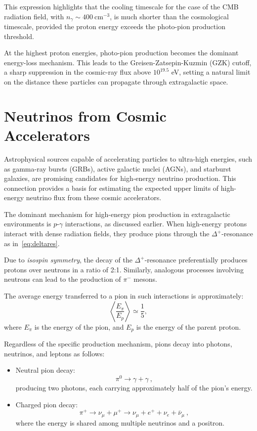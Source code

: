 This expression highlights that the cooling timescale for the case of the CMB radiation field, with \( n_\gamma \sim 400~\text{cm}^{-3} \), is much shorter than the cosmological timescale, provided the proton energy exceeds the photo-pion production threshold.

At the highest proton energies, photo-pion production becomes the dominant energy-loss mechanism. This leads to the Greisen-Zatsepin-Kuzmin (GZK) cutoff, a sharp suppression in the cosmic-ray flux above \( 10^{19.5} \) eV, setting a natural limit on the distance these particles can propagate through extragalactic space.

\section{Neutrinos from Cosmic Accelerators}

Astrophysical sources capable of accelerating particles to ultra-high energies, such as gamma-ray bursts (GRBs), active galactic nuclei (AGNs), and starburst galaxies, are promising candidates for high-energy neutrino production. This connection provides a basis for estimating the expected upper limits of high-energy neutrino flux from these cosmic accelerators.  

The dominant mechanism for high-energy pion production in extragalactic environments is \(p\)-\(\gamma\) interactions, as discussed earlier. When high-energy protons interact with dense radiation fields, they produce pions through the \(\Delta^+\)-resonance as in~\ref{eq:deltares}.

Due to \emph{isospin symmetry}, the decay of the \(\Delta^+\)-resonance preferentially produces protons over neutrons in a ratio of 2:1. Similarly, analogous processes involving neutrons can lead to the production of \(\pi^-\) mesons.

The average energy transferred to a pion in such interactions is approximately:
\begin{equation}
\left\langle \frac{E_\pi}{E_p} \right\rangle \simeq \frac{1}{5},
\end{equation}
where \(E_\pi\) is the energy of the pion, and \(E_p\) is the energy of the parent proton.

Regardless of the specific production mechanism, pions decay into photons, neutrinos, and leptons as follows:  
\begin{itemize}
\item Neutral pion decay:  
\begin{equation} \pi^0 \rightarrow \gamma + \gamma~, \end{equation}
producing two photons, each carrying approximately half of the pion's energy.
\item Charged pion decay:  
\begin{equation} \pi^+ \rightarrow \nu_\mu + \mu^+ \rightarrow \nu_\mu + e^+ + \nu_e + \bar{\nu}_\mu~, \end{equation}
where the energy is shared among multiple neutrinos and a positron.
\end{itemize}

